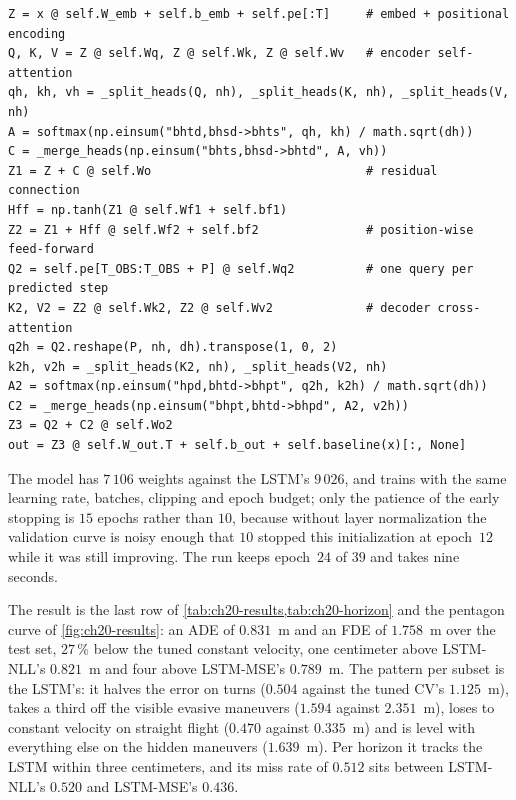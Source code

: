 \begin{lstlisting}[caption={The forward pass of the Transformer predictor (from \code{code/ch20\_prediction.py}): embedding plus positional encoding, one encoder self-attention layer, the feed-forward block, the cross-attention decoder with one query per predicted step, and the linear head. \code{\_split\_heads} reshapes $(B, T, d)$ into $(B, n_h, T, d/n_h)$ and \code{\_merge\_heads} inverts it.},label={lst:ch20-transformer}]
Z = x @ self.W_emb + self.b_emb + self.pe[:T]     # embed + positional encoding
Q, K, V = Z @ self.Wq, Z @ self.Wk, Z @ self.Wv   # encoder self-attention
qh, kh, vh = _split_heads(Q, nh), _split_heads(K, nh), _split_heads(V, nh)
A = softmax(np.einsum("bhtd,bhsd->bhts", qh, kh) / math.sqrt(dh))
C = _merge_heads(np.einsum("bhts,bhsd->bhtd", A, vh))
Z1 = Z + C @ self.Wo                              # residual connection
Hff = np.tanh(Z1 @ self.Wf1 + self.bf1)
Z2 = Z1 + Hff @ self.Wf2 + self.bf2               # position-wise feed-forward
Q2 = self.pe[T_OBS:T_OBS + P] @ self.Wq2          # one query per predicted step
K2, V2 = Z2 @ self.Wk2, Z2 @ self.Wv2             # decoder cross-attention
q2h = Q2.reshape(P, nh, dh).transpose(1, 0, 2)
k2h, v2h = _split_heads(K2, nh), _split_heads(V2, nh)
A2 = softmax(np.einsum("hpd,bhtd->bhpt", q2h, k2h) / math.sqrt(dh))
C2 = _merge_heads(np.einsum("bhpt,bhtd->bhpd", A2, v2h))
Z3 = Q2 + C2 @ self.Wo2
out = Z3 @ self.W_out.T + self.b_out + self.baseline(x)[:, None]
\end{lstlisting}

The model has $7\,106$ weights against the LSTM's $9\,026$, and trains with
the same learning rate, batches, clipping and epoch budget; only the patience
of the early stopping is $15$ epochs rather than $10$, because without layer
normalization the validation curve is noisy enough that $10$ stopped this
initialization at epoch~$12$ while it was still improving. The run keeps
epoch~$24$ of $39$ and takes nine seconds.

The result is the last row of \cref{tab:ch20-results,tab:ch20-horizon} and
the pentagon curve of \cref{fig:ch20-results}: an ADE of $0.831$~m and an FDE
of $1.758$~m over the test set, $27\,\%$ below the tuned constant velocity,
one centimeter above LSTM-NLL's $0.821$~m and four above LSTM-MSE's
$0.789$~m. The pattern per subset is the LSTM's: it halves the error on turns
($0.504$ against the tuned CV's $1.125$~m), takes a third off the visible
evasive maneuvers ($1.594$ against $2.351$~m), loses to constant velocity on
straight flight ($0.470$ against $0.335$~m) and is level with everything else
on the hidden maneuvers ($1.639$~m). Per horizon it tracks the LSTM within
three centimeters, and its miss rate of $0.512$ sits between LSTM-NLL's
$0.520$ and LSTM-MSE's $0.436$.

